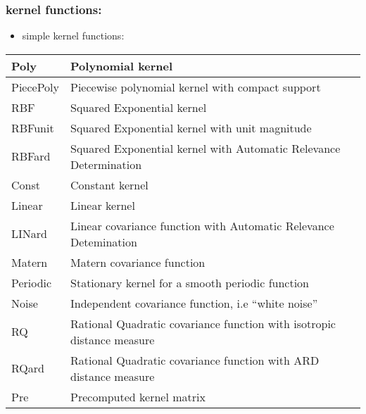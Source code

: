 \documentclass[letterpaper,10pt,english]{sphinxmanual}
\begin{document}
\subsubsection{kernel functions:}
\label{functionality:kernel-functions}\begin{itemize}
\item {} 
simple kernel functions:

\end{itemize}

\begin{tabulary}{\linewidth}{|L|L|}
\hline

Poly
 & 
Polynomial kernel
\\\hline

PiecePoly
 & 
Piecewise polynomial kernel with compact support
\\\hline

RBF
 & 
Squared Exponential kernel
\\\hline

RBFunit
 & 
Squared Exponential kernel with unit magnitude
\\\hline

RBFard
 & 
Squared Exponential kernel with Automatic Relevance Determination
\\\hline

Const
 & 
Constant kernel
\\\hline

Linear
 & 
Linear kernel
\\\hline

LINard
 & 
Linear covariance function with Automatic Relevance Detemination
\\\hline

Matern
 & 
Matern covariance function
\\\hline

Periodic
 & 
Stationary kernel for a smooth periodic function
\\\hline

Noise
 & 
Independent covariance function, i.e ``white noise''
\\\hline

RQ
 & 
Rational Quadratic covariance function with isotropic distance measure
\\\hline

RQard
 & 
Rational Quadratic covariance function with ARD distance measure
\\\hline

Pre
 & 
Precomputed kernel matrix
\\\hline
\end{tabulary}
\end{document}
